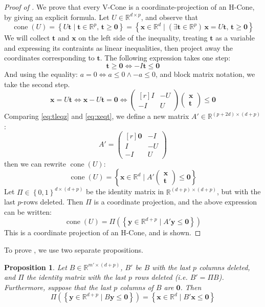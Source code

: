 \documentclass[fleqn]{article}
\renewcommand{\vec}[1]{\mathbf{#1}}
\newcommand{\set}[1]{\left\{#1\right\}}
\DeclareMathOperator{\cone}{cone}
\newcommand{\R}{\mathbb{R}}
\newcommand{\0}{\vec{0}}
\newcommand{\x}{\vec{x}}
\newcommand{\y}{\vec{y}}
\renewcommand{\t}{\vec{t}}
\newcommand{\st}{\;|\;}
\newcommand{\St}{\;\Big|\;}
\newcommand{\Udim}{p}
\newcommand{\tv}{\t \in \R^{\Udim}}
\newcommand{\xv}{\x \in \R^d}
\newcommand{\mU}{U \in \R^{d\times \Udim}}
\newcommand{\xt}{\begin{pmatrix*}\x\\ \t\end{pmatrix*}}
\newtheorem{Prop}{Proposition}
\begin{document}
\begin{proof}[Proof of {\Vcomp}]
  We prove that every V-Cone is a coordinate-projection of an H-Cone, by giving an explicit formula.  Let ${\mU}$, and observe that
  \[ \cone(U) = \set{U\t \st \t \in \R^{\Udim},\, \t \geq \0} = 
    \set{\xv \st (\exists \tv)\,\x = U\t,\, \t \geq \0} \]
  We will collect $\t$ and $\x$ on the left side of the inequality, treating $\t$ as a variable and expressing its contraints as linear inequalities, then project away the coordinates corresponding to $\t$.  The following expression takes one step:
  \begin{equation}\label{eq:tleqz}
  \t \geq \0 \Leftrightarrow -I\t \leq \0
  \end{equation}
  And using the equality: $a = 0 \Leftrightarrow a \leq 0 \land -a \leq 0$, and block matrix notation, we take the second step.
  \begin{equation}\label{eq:xeqt}
   \x = U\t \Leftrightarrow \x - U\t = \0 \Leftrightarrow
    \begin{pmatrix*}[r] I & -U \\ -I & U \end{pmatrix*} \xt \leq \0
  \end{equation}
  Comparing \eqref{eq:tleqz} and \eqref{eq:xeqt}, we define a new matrix $A' \in \R^{(\Udim+2d)\times(d+\Udim)}$:
  \[A' = \begin{pmatrix*}[r] \0 & -I \\ I & -U \\ -I & U \end{pmatrix*} \]
  then we can rewrite $\cone(U)$:
  \begin{equation*}
     \cone(U) = \set{ \xv \St A'\xt \leq \0}
  \end{equation*}
  Let $\Pi \in \set{0,1}^{d\times(d+\Udim)}$ be the identity matrix in $\R^{(d+\Udim)\times(d+\Udim)}$, but with the last $\Udim$-rows deleted.  Then $\Pi$ is a coordinate projection, and the above expression can be written:
  \begin{equation}\label{eq:vconelift}
    \cone(U) = \Pi\left(\set{ \y \in \R^{d+\Udim} \st A'\y \leq \0}\right)
  \end{equation}
  This is a coordinate projection of an H-Cone, and {\Vcomp} is shown.
\end{proof}
To prove {\Vproj}, we use two separate propositions.
\begin{Prop}{\label{prop:hconezero}
  Let $B\in\R^{m'\times(d+\Udim)}$, $B'$ be $B$ with the last $\Udim$ columns deleted, and $\Pi$ the identity matrix with the last $\Udim$ rows deleted (i.e. $B' = \Pi B$).  Furthermore, suppose that the last $\Udim$ columns of $B$ are $\0$.  Then
  \[ \Pi\left(\set{\y \in \R^{d+\Udim} \st B\y \leq \0}\right) = 
              \set{\x\in\R^d\st B'\x\leq\0} \]
}\end{Prop}
\end{document}
